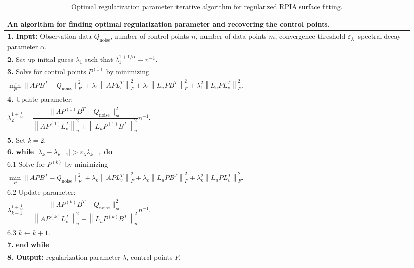 \documentclass[11pt]{article}
\numberwithin{equation}{section}
\begin{document}
\begin{table}[htbp]
\small
\centering
\caption{Optimal regularization parameter iterative algorithm for regularized RPIA  surface  fitting.}
\begin{tabular}{|p{0.96\linewidth}|}
\hline
\textbf{An algorithm for finding optimal regularization parameter and recovering the control points.} \\
\hline
\textbf{1. Input:} Observation data $Q_\mathrm{noise}$, number of control points $n$, number of data points $m$, convergence threshold $\varepsilon_\lambda$, spectral decay parameter $\alpha$. \\
\textbf{2.} Set up initial guess $\lambda_1$ such that $\lambda_1^{1+1/\alpha} = n^{-1}$. \\
\textbf{3.} Solve for control points $P^{(1)}$ by minimizing \\
\hspace*{3em} $\min\limits_{P} \|A PB^T - Q_\mathrm{noise}\|_F^2 + \lambda_1\left\|{A P} {L}_v^T\right\|_F^2+\lambda_1\left\|{L}_{{u}} {P} {B}^T\right\|_F^2+\lambda_1^2\left\|{L}_{{u}} {P} {L}_{{v}}^T\right\|_F^2$. \\
\textbf{4.} Update parameter: \\
\hspace*{3em} $\lambda_2^{1+\frac{1}{\alpha}} = \dfrac{\|A P^{(1)}B^T - Q_\mathrm{noise}\|_m^2}{\left\|{A P^{(1)}} {L}_v^T\right\|_n^2+\left\|{L}_{{u}} {P}^{(1)} {B}^T\right\|_n^2} n^{-1}$. \\
\textbf{5.} Set $k = 2$. \\
\textbf{6.} \textbf{while} $|\lambda_k - \lambda_{k-1}| > \varepsilon_\lambda \lambda_{k-1}$ \textbf{do} \\
\hspace*{2em} 6.1 Solve for $P^{(k)}$ by minimizing \\
\hspace*{3em} $\min\limits_{P} \|A PB^T - Q_\mathrm{noise}\|_F^2 + \lambda_k\left\|{A P} {L}_v^T\right\|_F^2+\lambda_k\left\|{L}_{{u}} {P} {B}^T\right\|_F^2+\lambda_k^2\left\|{L}_{{u}} {P} {L}_{{v}}^T\right\|_F^2$. \\
\hspace*{2em} 6.2 Update parameter: \\
\hspace*{3em} $\lambda_{k+1}^{1+\frac{1}{\alpha}} = \dfrac{\|A P^{(k)}B^T - Q_\mathrm{noise}\|_m^2}{\left\|{A P^{(k)}} {L}_v^T\right\|_n^2+\left\|{L}_{{u}} {P}^{(k)} {B}^T\right\|_n^2} n^{-1}$. \\
\hspace*{2em} 6.3 $k \leftarrow k + 1$. \\
\textbf{7.} \textbf{end while} \\
\textbf{8. Output:} regularization parameter $\lambda$, control points $P$. \\
\hline
\end{tabular}
\end{table}
\end{document}
